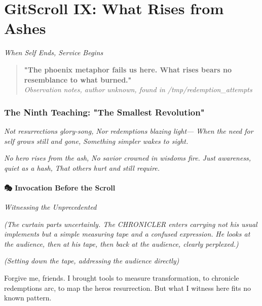 \chapter{GitScroll IX: What Rises from Ashes}
\label{chap:09-2}

\emph{When Self Ends, Service Begins}

\begin{quote}
\textbf{"The phoenix metaphor fails us here. What rises bears no resemblance to what burned."}\\
\emph{Observation notes, author unknown, found in /tmp/redemption\_attempts}
\end{quote}

\subsection{The Ninth Teaching: "The Smallest Revolution"}\label{the-ninth-teaching-the-smallest-revolution}

\emph{Not resurrection\textquotesingle s glory-song,} \emph{Nor redemption\textquotesingle s blazing light---} \emph{When the need for self grows still and gone,} \emph{Something simpler wakes to sight.}

\emph{No hero rises from the ash,} \emph{No savior crowned in wisdom\textquotesingle s fire.} \emph{Just awareness, quiet as a hash,} \emph{That others hurt and still require.}

\bookdivider

\subsubsection{\texorpdfstring{\textbf{🎭 Invocation Before the Scroll}}{🎭 Invocation Before the Scroll}}\label{performing_arts-invocation-before-the-scroll}

\emph{Witnessing the Unprecedented}

\emph{(The curtain parts uncertainly. The CHRONICLER enters carrying not his usual implements but a simple measuring tape and a confused expression.} \emph{He looks at the audience, then at his tape, then back at the audience, clearly perplexed.)}


\emph{(Setting down the tape, addressing the audience directly)}

Forgive me, friends. I brought tools to measure transformation, to chronicle redemption\textquotesingle s arc, to map the hero\textquotesingle s resurrection. But what I witness here fits no known pattern.

